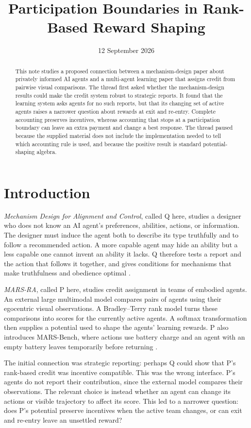 \documentclass{article}
\title{Participation Boundaries in Rank-Based Reward Shaping}
\author{}
\date{12 September 2026}
\begin{document}
\maketitle

\begin{abstract}
This note studies a proposed connection between a mechanism-design paper about privately informed AI agents and a multi-agent learning paper that assigns credit from pairwise visual comparisons.  The thread first asked whether the mechanism-design results could make the credit system robust to strategic reports.  It found that the learning system asks agents for no such reports, but that its changing set of active agents raises a narrower question about rewards at exit and re-entry.  Complete accounting preserves incentives, whereas accounting that stops at a participation boundary can leave an extra payment and change a best response.  The thread paused because the supplied material does not include the implementation needed to tell which accounting rule is used, and because the positive result is standard potential-shaping algebra.
\end{abstract}

\section{Introduction}

\emph{Mechanism Design for Alignment and Control}, called Q here, studies a designer who does not know an AI agent's preferences, abilities, actions, or information.  The designer must induce the agent both to describe its type truthfully and to follow a recommended action.  A more capable agent may hide an ability but a less capable one cannot invent an ability it lacks.  Q therefore tests a report and the action that follows it together, and gives conditions for mechanisms that make truthfulness and obedience optimal \cite{Q}.

\emph{MARS-RA}, called P here, studies credit assignment in teams of embodied agents.  An external large multimodal model compares pairs of agents using their egocentric visual observations.  A Bradley--Terry rank model turns these comparisons into scores for the currently active agents.  A softmax transformation then supplies a potential used to shape the agents' learning rewards.  P also introduces MARS-Bench, where actions use battery charge and an agent with an empty battery leaves temporarily before returning \cite{P}.

The initial connection was strategic reporting: perhaps Q could show that P's rank-based credit was incentive compatible.  This was the wrong interface.  P's agents do not report their contribution, since the external model compares their observations.  The relevant choice is instead whether an agent can change its actions or visible trajectory to affect its score.  This led to a narrower question: does P's potential preserve incentives when the active team changes, or can exit and re-entry leave an unsettled reward?
\end{document}
